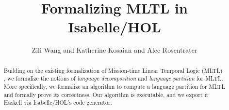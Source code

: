 \documentclass[11pt,a4paper]{article}
\begin{document}
\title{Formalizing MLTL in Isabelle/HOL}
\author{Zili Wang and Katherine Kosaian and Alec Rosentrater}
\maketitle

\begin{abstract}
  Building on the existing formalization of Mission-time Linear Temporal Logic (MLTL) \cite{Mission_Time_LTL-AFP}, we formalize the notions of \textit{language decomposition} and \textit{language partition} for MLTL. 
  More specifically, we formalize an algorithm to compute a language partition for MLTL and formally prove its correctness.
  Our algorithm is executable, and we export it Haskell via Isabelle/HOL's code generator.
\end{abstract}

\tableofcontents





\end{document}
